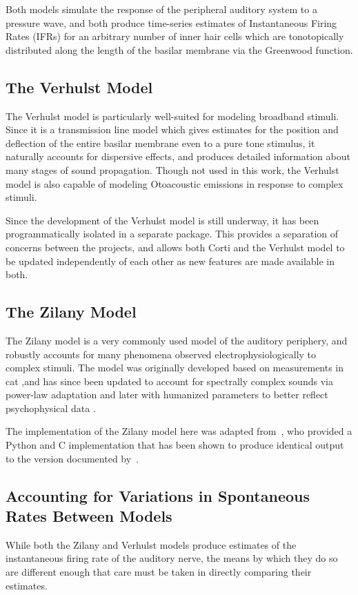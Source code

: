 Both models simulate the response of the peripheral auditory system to a pressure wave, and both produce time-series estimates of Instantaneous Firing Rates (IFRs) for an arbitrary number of inner hair cells which are tonotopically distributed along the length of the basilar membrane via the Greenwood function.
\subsection{The Verhulst Model} %
\label{sub:the_verhulst_model1}
The Verhulst model is particularly well-suited for modeling broadband stimuli.  Since it is a transmission line model which gives estimates for the position and deflection of the entire basilar membrane even to a pure tone stimulus, it naturally accounts for dispersive effects, and produces detailed information about many stages of sound propagation. Though not used in this work, the Verhulst model is also capable of modeling Otoacoustic emissions in response to complex stimuli. 

Since the development of the Verhulst model is still underway, it has been programmatically isolated in a separate package.  This provides a separation of concerns between the projects, and allows both Corti and the Verhulst model to be updated independently of each other as new features are made available in both.
\subsection{The Zilany Model} %
\label{sub:the_zilany_model}
The Zilany model is a very commonly used model of the auditory periphery, and robustly accounts for many phenomena observed electrophysiologically to complex stimuli.  The model was originally developed based on measurements in cat \citep{Zilany2006Modeling},and has since been updated to account for spectrally complex sounds via power-law adaptation \citep{Zilany2007Predictions} and later with humanized parameters to better reflect psychophysical data \citep{Zilany2014Updated}. 

The implementation of the Zilany model here was adapted from~\cite{Rudnicki2014Cochlea}, who provided a Python and C implementation that has been shown to produce identical output to the version documented by~\cite{Zilany2014Updated}.

\subsection{Accounting for Variations in Spontaneous Rates Between Models} %
\label{sub:interoperability_of_the_zilany_and_verhulst_models}
While both the Zilany and Verhulst models produce estimates of the instantaneous firing rate of the auditory nerve, the means by which they do so are different enough that care must be taken in directly comparing their estimates.  

